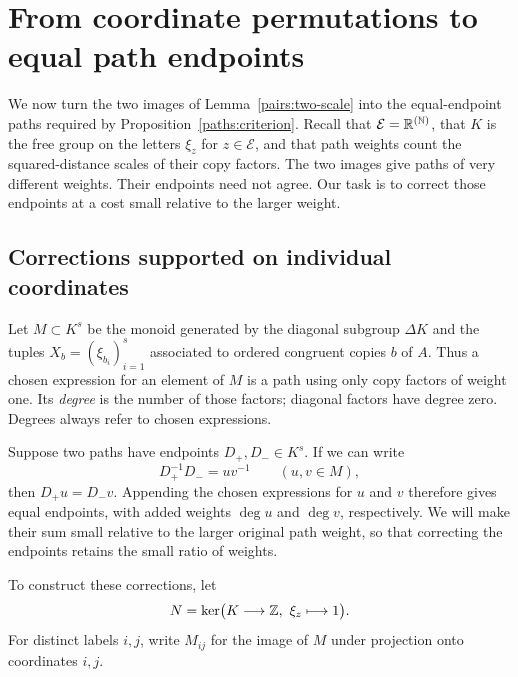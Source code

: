 \section{From coordinate permutations to equal path endpoints}
\label{sec:groups}

We now turn the two images of Lemma~\ref{pairs:two-scale} into the
equal-endpoint paths required by Proposition~\ref{paths:criterion}.
Recall that $\mathcal E=\mathbb R^{(\mathbb N)}$, that $K$ is the free group on
the letters $\xi_z$ for $z\in\mathcal E$, and that path weights count
the squared-distance scales of their copy factors.  The two images give
paths of very different weights.  Their endpoints need not agree.
Our task is to correct those endpoints at a cost small relative to the
larger weight.

\subsection{Corrections supported on individual coordinates}

Let $M\subset K^s$ be the monoid generated by the diagonal subgroup
$\Delta K$ and the tuples $X_b=(\xi_{b_i})_{i=1}^s$ associated to
ordered congruent copies $b$ of $A$.  Thus a chosen expression for an
element of $M$ is a path using only copy factors of weight one.
Its \emph{degree} is the number of those factors; diagonal factors have
degree zero.  Degrees always refer to chosen expressions.

Suppose two paths have endpoints $D_+,D_-\in K^s$. If we can write
\[
 D_+^{-1}D_-=uv^{-1}\qquad(u,v\in M),
\]
then $D_+u=D_-v$. Appending the chosen expressions for $u$ and $v$
therefore gives equal endpoints, with added weights $\deg u$ and
$\deg v$, respectively. We will make their sum small relative to the
larger original path weight, so that correcting the endpoints retains
the small ratio of weights.

To construct these corrections, let
\[
 N=\ker\bigl(K\longrightarrow\Z,\ \xi_z\longmapsto1\bigr).
\]
For distinct labels $i,j$, write $M_{ij}$ for the image of $M$ under
projection onto coordinates $i,j$.

